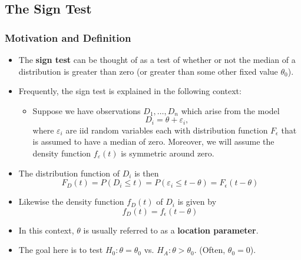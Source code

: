 \documentclass[]{book}
\providecommand{\tightlist}{%
  \setlength{\itemsep}{0pt}\setlength{\parskip}{0pt}}
\begin{document}
\hypertarget{sign-test}{%
\subsection{The Sign Test}\label{sign-test}}

\hypertarget{motivation-and-definition}{%
\subsubsection{Motivation and Definition}\label{motivation-and-definition}}

\begin{itemize}
\item
  The \textbf{sign test} can be thought of as a test of whether or not
  the median of a distribution is greater than zero (or greater than some other fixed value \(\theta_{0}\)).
\item
  Frequently, the sign test is explained in the following context:

  \begin{itemize}
  \tightlist
  \item
    Suppose we have observations \(D_{1}, \ldots, D_{n}\) which arise from the model
    \begin{equation}
    D_{i} = \theta + \varepsilon_{i},
    \label{eq:general-location}
    \end{equation}
    where \(\varepsilon_{i}\) are iid random variables each with distribution function \(F_{\epsilon}\)
    that is assumed to have a median of zero. Moreover, we will assume the density function
    \(f_{\varepsilon}(t)\) is symmetric around zero.
  \end{itemize}
\item
  The distribution function of \(D_{i}\) is then
  \begin{equation}
  F_{D}(t) = P(D_{i} \leq t) = P(\varepsilon_{i} \leq t - \theta) = F_{\epsilon}(t - \theta)
  \end{equation}
\item
  Likewise the density function \(f_{D}(t)\) of \(D_{i}\) is given by
  \begin{equation}
  f_{D}(t) = f_{\epsilon}(t - \theta)
  \end{equation}
\item
  In this context, \(\theta\) is usually referred to as a \textbf{location parameter}.
\item
  The goal here is to test \(H_{0}: \theta = \theta_{0}\) vs. \(H_{A}: \theta > \theta_{0}\). (Often, \(\theta_{0} = 0\)).
\end{itemize}
\end{document}

